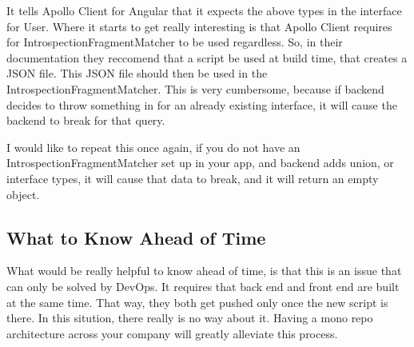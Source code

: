 It tells Apollo Client for Angular that it expects the above types in the
interface for User. Where it starts to get really interesting is that Apollo
Client requires for IntrospectionFragmentMatcher to be used regardless. So, in
their documentation they reccomend that a script be used at build time, that
creates a JSON file. This JSON file should then be used in the
IntrospectionFragmentMatcher. This is very cumbersome, because if backend
decides to throw something in for an already existing interface, it will cause
the backend to break for that query.

I would like to repeat this once again, if you do not have an
IntrospectionFragmentMatcher set up in your app, and backend adds union, or
interface types, it will cause that data to break, and it will return an empty
object.


\subsection{ What to Know Ahead of Time }
What would be really helpful to know ahead of time, is that this is an issue
that can only be solved by DevOps. It requires that back end and front end are
built at the same time. That way, they both get pushed only once the new script
is there. In this sitution, there really is no way about it. Having a mono repo
architecture across your company will greatly alleviate this process.
